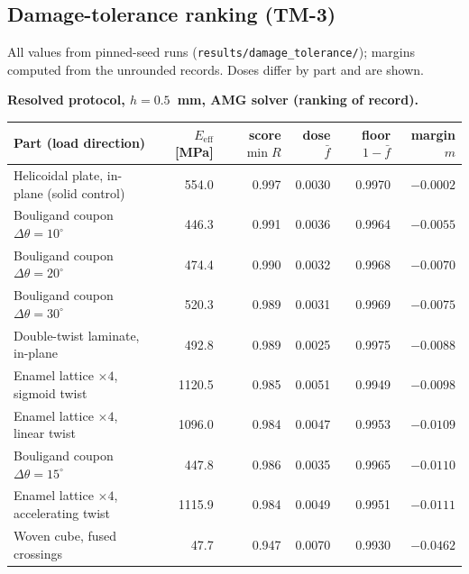 \documentclass[11pt]{article}
\begin{document}
\subsection{Damage-tolerance ranking (TM-3)}
All values from pinned-seed runs (\texttt{results/damage\_tolerance/}); margins computed from the
unrounded records. Doses differ by part and are shown.

\noindent\textbf{Resolved protocol, $h = 0.5$~mm, AMG solver (ranking of record).}
\begin{center}\small
\begin{tabular}{lrrrrr}
\toprule
Part (load direction) & $E_{\mathrm{eff}}$ [MPa] & score $\min R$ & dose $\bar f$ & floor $1{-}\bar f$ & margin $m$ \\
\midrule
Helicoidal plate, in-plane (solid control) & 554.0 & 0.997 & 0.0030 & 0.9970 & $-0.0002$ \\
Bouligand coupon $\Delta\theta=10^\circ$ & 446.3 & 0.991 & 0.0036 & 0.9964 & $-0.0055$ \\
Bouligand coupon $\Delta\theta=20^\circ$ & 474.4 & 0.990 & 0.0032 & 0.9968 & $-0.0070$ \\
Bouligand coupon $\Delta\theta=30^\circ$ & 520.3 & 0.989 & 0.0031 & 0.9969 & $-0.0075$ \\
Double-twist laminate, in-plane & 492.8 & 0.989 & 0.0025 & 0.9975 & $-0.0088$ \\
Enamel lattice $\times 4$, sigmoid twist & 1120.5 & 0.985 & 0.0051 & 0.9949 & $-0.0098$ \\
Enamel lattice $\times 4$, linear twist & 1096.0 & 0.984 & 0.0047 & 0.9953 & $-0.0109$ \\
Bouligand coupon $\Delta\theta=15^\circ$ & 447.8 & 0.986 & 0.0035 & 0.9965 & $-0.0110$ \\
Enamel lattice $\times 4$, accelerating twist & 1115.9 & 0.984 & 0.0049 & 0.9951 & $-0.0111$ \\
Woven cube, fused crossings & 47.7 & 0.947 & 0.0070 & 0.9930 & $-0.0462$ \\
\bottomrule
\end{tabular}
\end{center}
\end{document}
